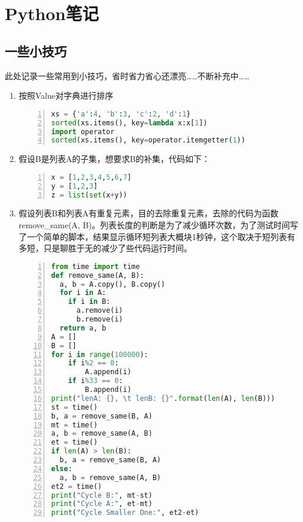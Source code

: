 \chapter{Python笔记}
\section{一些小技巧}
此处记录一些常用到小技巧，省时省力省心还漂亮……不断补充中……
\begin{enumerate}
  \item 按照Value对字典进行排序
    \begin{lstlisting}[language = python, numbers=left, 
             numberstyle=\tiny,keywordstyle=\color{blue!70},
             commentstyle=\color{red!50!green!50!blue!50},frame=shadowbox,
             rulesepcolor=\color{red!20!green!20!blue!20},basicstyle=\ttfamily]
xs = {'a':4, 'b':3, 'c':2, 'd':1}
sorted(xs.items(), key=lambda x:x[1])
import operator
sorted(xs.items(), key=operator.itemgetter(1))
    \end{lstlisting}
  \item 假设B是列表A的子集，想要求B的补集，代码如下：
    \begin{lstlisting}[language = python, numbers=left, 
             numberstyle=\tiny,keywordstyle=\color{blue!70},
             commentstyle=\color{red!50!green!50!blue!50},frame=shadowbox,
             rulesepcolor=\color{red!20!green!20!blue!20},basicstyle=\ttfamily]
x = [1,2,3,4,5,6,7]
y = [1,2,3]
z = list(set(x+y))
    \end{lstlisting}
  \item 假设列表B和列表A有重复元素，目的去除重复元素，去除的代码为函数 remove\_same(A, B)。列表长度的判断是为了减少循环次数，为了测试时间写了一个简单的脚本，结果显示循环短列表大概块1秒钟，这个取决于短列表有多短，只是聊胜于无的减少了些代码运行时间。
    \begin{lstlisting}[language = python, numbers=left, 
             numberstyle=\tiny,keywordstyle=\color{blue!70},
             commentstyle=\color{red!50!green!50!blue!50},frame=shadowbox,
             rulesepcolor=\color{red!20!green!20!blue!20},basicstyle=\ttfamily]
from time import time
def remove_same(A, B):
  a, b = A.copy(), B.copy()
  for i in A:
    if i in B:
      a.remove(i)
      b.remove(i)
  return a, b
A = []
B = []
for i in range(100000):
    if i%2 == 0:
        A.append(i)
    if i%33 == 0:
        B.append(i)
print("lenA: {}, \t lenB: {}".format(len(A), len(B)))
st = time()
b, a = remove_same(B, A)
mt = time()
a, b = remove_same(A, B)
et = time()
if len(A) > len(B):
  b, a = remove_same(B, A)
else:
  a, b = remove_same(A, B)
et2 = time()
print("Cycle B:", mt-st)
print("Cycle A:", et-mt)
print("Cycle Smaller One:", et2-et)
    \end{lstlisting}
\end{enumerate}


